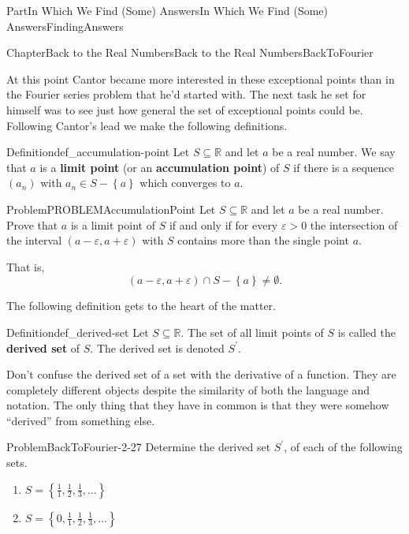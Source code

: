 \documentclass[oneside,10pt,]{book}
\newcommand{\terminology}[1]{\textbf{#1}}
\numberwithin{equation}{part}
\newcommand{\eps}{\varepsilon}
\newcommand{\RR}{\mathbb {R}}
\begin{document}
\begin{partptx}{Part}{In Which We Find (Some) Answers}{}{In Which We Find (Some) Answers}{}{}{FindingAnswers}
\begin{chapterptx}{Chapter}{Back to the Real Numbers}{}{Back to the Real Numbers}{}{}{BackToFourier}
\begin{introduction}{}
\par
At this point Cantor became more interested in these exceptional points than in the Fourier series problem that he'd started with.  The next task he set for himself was to see just how general the set of exceptional points could be.  Following Cantor's lead we make the following definitions.%
\begin{definition}{Definition}{}{def_accumulation-point}%
%
%
Let \(S\subseteq \RR\) and let \(a\) be a real number. We say that \(a\) is a \terminology{limit point} (or an \terminology{accumulation point}) of \(S\) if there is a sequence \((a_n)\) with \(a_n\in S-\left\{a\right\}\) which converges to \(a\).%
\end{definition}
\begin{problem}{Problem}{}{PROBLEMAccumulationPoint}%
Let \(S\subseteq\RR\) and let \(a\) be a real number. Prove that \(a\) is a limit point of \(S\) if and only if for every \(\eps>0\) the intersection of the interval \((a-\eps, a+\eps)\) with \(S\) contains more than the single point \({a}\).%
\par
That is,%
\begin{equation*}
(a-\eps, a+\eps) \cap S -\left\{a\right\} \neq \emptyset. 
\end{equation*}
%
\end{problem}
The following definition gets to the heart of the matter.%
\begin{definition}{Definition}{}{def_derived-set}%
%
Let \(S\subseteq\RR\).  The set of all limit points of \(S\) is called the \terminology{derived set} of \(S\). The derived set is denoted \(S^{\prime}\).%
\end{definition}
Don't confuse the derived set of a set with the derivative of a function.  They are completely different objects despite the similarity of both the language and notation.  The only thing that they have in common is that they were somehow ``derived'' from something else.%
\begin{problem}{Problem}{}{BackToFourier-2-27}%
Determine the derived set \(S^\prime\), of each of the following sets.%
\begin{multicols}{2}
\begin{enumerate}[label={(\alph*)}]
\item{}\(\displaystyle S=\left\{\frac11, \frac12, \frac13, \ldots\right\}\)%
\item{}\(\displaystyle S=\left\{0,\frac11, \frac12, \frac13, \ldots\right\}\)%

\end{enumerate}
\end{multicols}
\end{problem}
\end{introduction}
\end{chapterptx}
\end{partptx}
\end{document}
